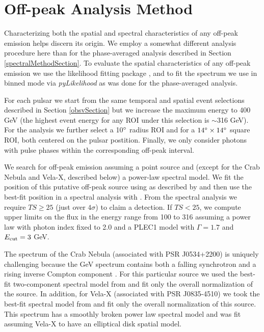 \section{Off-peak Analysis Method}

Characterizing both the spatial and spectral
characteristics of any off-peak emission helps discern its origin.
We employ a somewhat different analysis procedure here than
for the phase-averaged analysis described in Section
\ref{spectralMethodSection}.  To evaluate the spatial characteristics of
any off-peak emission we use the likelihood fitting package \pointlike
\citep[detailed in][]{LAT_collaboration_extended_search_2012}, and
to fit the spectrum we use \gtlike in binned mode via {\it pyLikelihood} as was done for the
phase-averaged analysis.

For each pulsar we start from
the same temporal and spatial event selections described in Section
\ref{obsvSection} but we increase the maximum energy to 400 GeV (the
highest event energy for any ROI under this selection is $\sim$316 GeV).
For the \pointlike analysis we further select a 10$^\circ$ radius ROI
and for \gtlike a $14^\circ\times14^\circ$ square ROI, both centered
on the pulsar postition.  Finally, we only consider photons with 
pulse phases within the corresponding off-peak interval.

We search for off-peak emission
assuming a point source and (except for the Crab Nebula and Vela-X, described below) 
a power-law spectral model.  We fit the position of this
putative off-peak source using \pointlike as described by \citet{2FGL}
and then use the best-fit position in a spectral analysis with \gtlike.
From the spectral analysis we require $TS\geq25$ (just over $4\sigma$)
to claim a detection.  If $TS<25$, we compute upper limits on the flux 
in the energy range from 100 \mev to 316 \gev
assuming
a power law with photon index fixed to 2.0 and a PLEC1 model with
$\Gamma=1.7$ and $E_{\rm cut}=3$ GeV.

The spectrum of the Crab Nebula (associated with PSR J0534+2200) is
uniquely challenging because the GeV spectrum contains both a falling
synchrotron and a rising inverse Compton component \citep{FermiCrab}.
For this particular source we used the best-fit two-component spectral
model from \cite{LAT_collaboration_crab_2012} and fit only the overall
normalization of the source. 
In addition, for Vela-X (associated with PSR J0835-4510) we took the
best-fit spectral model from \cite{FermiVelaX2nd} and fit only the overall
normalization of this source. This spectrum has a smoothly broken power
law spectral model and was fit assuming Vela-X to have an elliptical
disk spatial model.

